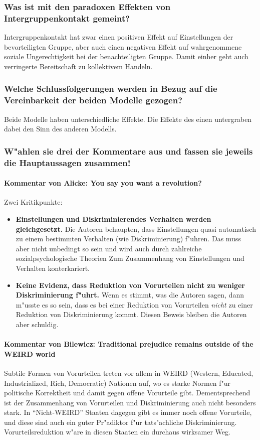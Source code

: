 \subsubsection{Was ist mit den paradoxen Effekten von Intergruppenkontakt gemeint?}
Intergruppenkontakt hat zwar einen positiven Effekt auf Einstellungen der bevorteiligten Gruppe, aber auch einen negativen Effekt auf wahrgenommene soziale Ungerechtigkeit bei der benachteiligten Gruppe. Damit einher geht auch verringerte Bereitschaft zu kollektivem Handeln.

\subsubsection{Welche Schlussfolgerungen werden in Bezug auf die Vereinbarkeit der beiden Modelle gezogen?}
Beide Modelle haben unterschiedliche Effekte. Die Effekte des einen untergraben dabei den Sinn des anderen Modells.

\subsubsection{W"ahlen sie drei der Kommentare aus und fassen sie jeweils die Hauptaussagen zusammen!}
\paragraph{Kommentar von Alicke: You say you want a revolution?}
Zwei Kritikpunkte:\\
\begin{itemize}
        \item \textbf{Einstellungen und Diskriminierendes Verhalten werden gleichgesetzt.} Die Autoren behaupten, dass Einstellungen quasi automatisch zu einem bestimmten Verhalten (wie Diskriminierung) f"uhren. Das muss aber nicht unbedingt so sein und wird auch durch zahlreiche sozialpsychologische Theorien Zum Zusammenhang von Einstellungen und Verhalten konterkariert.
        \item \textbf{Keine Evidenz, dass Reduktion von Vorurteilen nicht zu weniger Diskriminierung f"uhrt.} Wenn es stimmt, was die Autoren sagen, dann m"usste es so sein, dass es bei einer Reduktion von Vorurteilen \emph{nicht} zu einer Reduktion von Diskriminierung kommt. Diesen Beweis bleiben die Autoren aber schuldig.
\end{itemize}

\paragraph{Kommentar von Bilewicz: Traditional prejudice remains outside of the WEIRD world}
Subtile Formen von Vorurteilen treten vor allem in WEIRD (Western, Educated, Industrialized, Rich, Democratic) Nationen auf, wo es starke Normen f"ur politische Korrektheit und damit gegen offene Vorurteile gibt. Dementsprechend ist der Zusammenhang von Vorurteilen und Diskriminierung auch nicht besonders stark. In ``Nicht-WEIRD'' Staaten dagegen gibt es immer noch offene Vorurteile, und diese sind auch ein guter Pr"adiktor f"ur tats"achliche Diskriminierung. Vorurteilsreduktion w"are in diesen Staaten ein durchaus wirksamer Weg.

